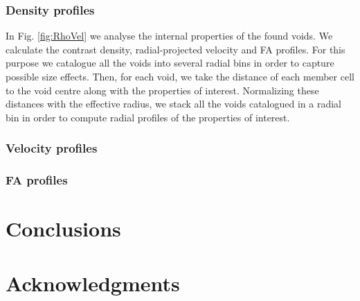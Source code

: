 \documentclass[a4,useAMS,usenatbib,usegraphicx]{latex/mn2e}
\begin{document}
\subsubsection{Density profiles}
\label{subsubsec:density_voids}


In Fig. \ref{fig:RhoVel} we analyse the internal properties of the found 
voids. We calculate the contrast density, radial-projected velocity and 
FA profiles. For this purpose we catalogue all the voids into several 
radial bins in order to capture possible size effects. Then, for each void, 
we take the distance of each member cell to the void centre along with the 
properties of interest. Normalizing these distances with the effective 
radius, we stack all the voids catalogued in a radial bin in order to 
compute radial profiles of the properties of interest.

\subsubsection{Velocity profiles}
\label{subsubsec:velocity_voids}

\subsubsection{FA profiles}
\label{subsubsec:FA_voids}


\section{Conclusions}
\label{sec:conclusions}


\section*{Acknowledgments}  




\end{document}
